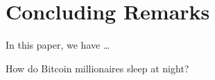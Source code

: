 
\section{Concluding Remarks}

In this paper, we have \dots

How do Bitcoin millionaires sleep at night?